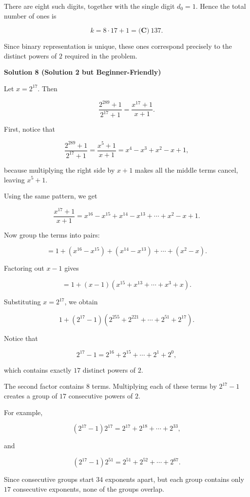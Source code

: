 \begin{enumerate}
 There are eight such digits, together with the single digit $d_0=1$. Hence the total number of ones is

 
 \[k=8\cdot17+1=\boxed{\textbf{(C)}\ 137}.\]

 Since binary representation is unique, these ones correspond precisely to the distinct powers of $2$ required in the problem.

 


 



\textbf{Solution 8 (Solution 2 but Beginner-Friendly)}

Let $x=2^{17}$. Then

 
 \[\frac{2^{289}+1}{2^{17}+1}=\frac{x^{17}+1}{x+1}.\]

 First, notice that

 
 \[\frac{2^{289}+1}{2^{17}+1}=\frac{x^5+1}{x+1}=x^4-x^3+x^2-x+1,\]

 because multiplying the right side by $x+1$ makes all the middle terms cancel, leaving $x^5+1$.

 Using the same pattern, we get

 
 \[\frac{x^{17}+1}{x+1}=x^{16}-x^{15}+x^{14}-x^{13}+\cdots+x^2-x+1.\]

 Now group the terms into pairs:

 
 \[=1+(x^{16}-x^{15})+(x^{14}-x^{13})+\cdots+(x^2-x).\]

 Factoring out $x-1$ gives

 
 \[=1+(x-1)(x^{15}+x^{13}+\cdots+x^3+x).\]

 Substituting $x=2^{17}$, we obtain

 
 \[1+(2^{17}-1)(2^{255}+2^{221}+\cdots+2^{51}+2^{17}).\]

 Notice that

 
 \[2^{17}-1=2^{16}+2^{15}+\cdots+2^1+2^0,\]

 which contains exactly $17$ distinct powers of $2$.

 The second factor contains $8$ terms. Multiplying each of these terms by $2^{17}-1$ creates a group of $17$ consecutive powers of $2$.

 For example,

 
 \[(2^{17}-1)2^{17}=2^{17}+2^{18}+\cdots+2^{33},\]

 and

 
 \[(2^{17}-1)2^{51}=2^{51}+2^{52}+\cdots+2^{67}.\]

 Since consecutive groups start $34$ exponents apart, but each group contains only $17$ consecutive exponents, none of the groups overlap.


\end{enumerate}
